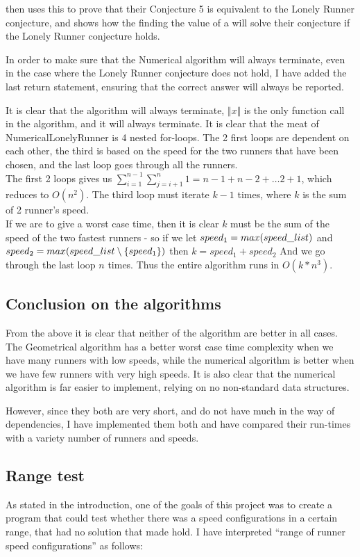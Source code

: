 {
\cite{invis} then uses this to prove that their Conjecture 5 is equivalent to the Lonely Runner conjecture, and shows how the finding the value of a will solve their conjecture if the Lonely Runner conjecture holds.

In order to make sure that the Numerical algorithm will always terminate, even in the case where the Lonely Runner conjecture does not hold, I have added the last return statement, ensuring that the correct answer will always be reported.
}
{}
{
It is clear that the algorithm will always terminate, $\Vert x \Vert $ is the only function call in the algorithm, and it will always terminate.
}
{}
{
It is clear that the meat of NumericalLonelyRunner is 4 nested for-loops. The 2 first loops are dependent on each other, the third is based on the speed for the two runners that have been chosen, and the last loop goes through all the runners.\\

The first 2 loops gives us $\sum_{i=1}^{n-1}\sum_{j=i+1}^{n}1 = n-1 + n-2 + \ldots 2 + 1$, which reduces to $O(n^2)$. The third loop must iterate $k-1$ times, where $k$ is the sum of 2 runner's speed.\\

If we are to give a worst case time, then it is clear $k$ must be the sum of the speed of the two fastest runners - so if we let $speed_1 = max(speed\_list)$ and $speed_2 = max(speed\_list \setminus \{speed_1\})$ then $k = speed_1 + speed_2$
And we go through the last loop $n$ times. Thus the entire algorithm runs in $O(k * n^3)$.
}{}

\subsection{Conclusion on the algorithms}

From the above it is clear that neither of the algorithm are better in all cases. The Geometrical algorithm has a better worst case time complexity when we have many runners with low speeds, while the numerical algorithm is better when we have few runners with very high speeds. It is also clear that the numerical algorithm is far easier to implement, relying on no non-standard data structures.

However, since they both are very short, and do not have much in the way of dependencies, I have implemented them both and have compared their run-times with a variety number of runners and speeds.\\

\subsection{Range test}
As stated in the introduction, one of the goals of this project was to create a program that could test whether there was a speed configurations in a certain range, that had no solution that made  hold. I have interpreted ``range of runner speed configurations'' as follows:\\

